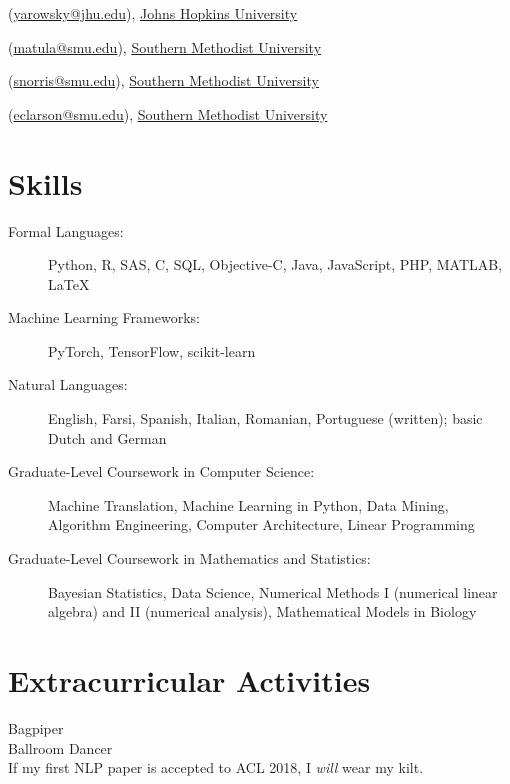 \documentclass[margin, 10pt]{res} %
\newcommand{\CPP}
{C\nolinebreak[4]\hspace{-.05em}\raisebox{.22ex}{\footnotesize\bf ++}}
\newcommand{\JHU}{\href{https://www.jhu.edu/}{Johns Hopkins University}}
\newcommand{\SMU}{\href{https://www.smu.edu/}{Southern Methodist University}}
\begin{document}
\begin{resume}
\begin{description}[noitemsep]
\item[David Yarowsky] (\href{mailto:yarowsky@jhu.edu}{yarowsky@jhu.edu}), \JHU
\item[David W. Matula] (\href{mailto:matula@smu.edu}{matula@smu.edu}), \SMU
\item[Scott Norris] (\href{mailto:snorris@smu.edu}{snorris@smu.edu}), \SMU
\item[Eric C. Larson] (\href{mailto:eclarson@smu.edu}{eclarson@smu.edu}), \SMU
\end{description}


\section{Skills}

\begin{description}
\item[Formal Languages:] Python, R, SAS, \CPP, SQL, Objective-C, Java, JavaScript, PHP, MATLAB, \LaTeX
\item[Machine Learning Frameworks:] PyTorch, TensorFlow, scikit-learn
\item[Natural Languages:] English, Farsi, Spanish, Italian, Romanian, Portuguese (written); basic Dutch and German
\item[Graduate-Level Coursework in Computer Science:] Machine Translation, Machine Learning in Python, Data Mining, Algorithm Engineering, Computer Architecture, Linear Programming
\item[Graduate-Level Coursework in Mathematics and Statistics:] Bayesian Statistics, Data Science, Numerical Methods I (numerical linear algebra) and II (numerical analysis), Mathematical Models in Biology
\end{description}


\section{Extracurricular Activities} 

Bagpiper \\
Ballroom Dancer\\
If my first NLP paper is accepted to ACL 2018, I \emph{will} wear my kilt.


\end{resume}
\end{document}
